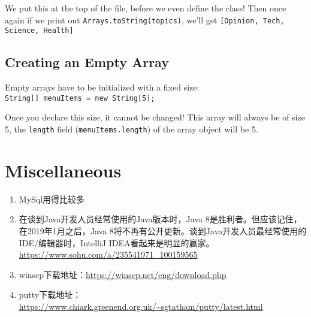 \documentclass[a4paper, 12pt]{article}
\begin{document}
We put this at the top of the file, before we even define the class! Then once again if we print out \verb|Arrays.toString(topics)|, we'll get \verb|[Opinion, Tech, Science, Health]|

\subsection{Creating an Empty Array}
Empty arrays have to be initialized with a fixed size:\\
\verb|String[] menuItems = new String[5];|

Once you declare this size, it cannot be changed! This array will always be of size 5, the \verb|length| field (\verb|menuItems.length|) of the array object will be 5.


\section{Miscellaneous}

\begin{enumerate}
\item MySql用得比较多

\item 在谈到Java开发人员经常使用的Java版本时，Java 8是胜利者。但应该记住，在2019年1月之后，Java 8将不再有公开更新。谈到Java开发人员最经常使用的IDE/编辑器时，IntelliJ IDEA看起来是明显的赢家。 \url{https://www.sohu.com/a/235541971_100159565}

\item winscp下载地址：\url{https://winscp.net/eng/download.php}

\item putty下载地址：\url{https://www.chiark.greenend.org.uk/~sgtatham/putty/latest.html}

\end{enumerate}
\end{document}
